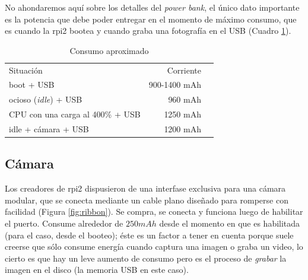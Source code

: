 \documentclass[10pt,a4paper]{article}
\begin{document}
No ahondaremos aqu\'i sobre los detalles del \emph{power bank}, el \'unico dato importante es la potencia que debe poder entregar en el momento de m\'aximo consumo, que es cuando la rpi2 bootea y cuando graba una fotograf\'ia en el USB (Cuadro \ref{tab:energia}).

\begin{table}[h!]
    \begin{center}
        \begin{tabular}{lll}
        \cline{1-2}
        \multicolumn{1}{|l|}{\cellcolor[HTML]{EFEFEF}Situaci\'on}   & \multicolumn{1}{r|}{\cellcolor[HTML]{EFEFEF}Corriente}    & \\
        \cline{1-2}
        \multicolumn{1}{|l|}{boot + USB}                            & \multicolumn{1}{r|}{900-1400 mAh}                         & \\
        \cline{1-2}
        \multicolumn{1}{|l|}{ocioso (\emph{idle}) + USB}            & \multicolumn{1}{r|}{960 mAh}                              & \\
        \cline{1-2}
        \multicolumn{1}{|l|}{CPU con una carga al 400\% + USB}      & \multicolumn{1}{r|}{1250 mAh}                             & \\
        \cline{1-2}
        \multicolumn{1}{|l|}{idle + c\'amara + USB}                 & \multicolumn{1}{r|}{1200 mAh}                             &
        \end{tabular}
    \end{center}
    \caption{Consumo aproximado}
    \label{tab:energia}
\end{table}

\subsection{C\'amara}

Los creadores de rpi2 dispusieron de una interfase exclusiva para una c\'amara modular, que se conecta mediante un cable plano dise\~nado para romperse con facilidad (Figura \ref{fig:ribbon}). Se compra, se conecta y funciona luego de habilitar el puerto. Consume alrededor de $250 mAh$ desde el momento en que es habilitada (para el caso, desde el booteo); \'este es un factor a tener en cuenta porque suele creerse que s\'olo consume energ\'ia cuando captura una imagen o graba un video, lo cierto es que hay un leve aumento de consumo pero es el proceso de \emph{grabar} la imagen en el disco (la memoria USB en este caso).\\
\end{document}
